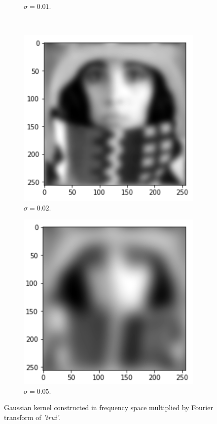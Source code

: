 \begin{figure}[H]
\begin{subfigure}[b]{0.45\textwidth}
		\caption{$\sigma = 0.01$.}
	\end{subfigure}
	\hfill
	\\
	\begin{subfigure}[b]{0.45\textwidth}
		\centering
		\includegraphics[width=\textwidth]{Materials/02}
		\caption{$\sigma = 0.02$.}
	\end{subfigure}
	\hfill
	\begin{subfigure}[b]{0.45\textwidth}
		\centering
		\includegraphics[width=\textwidth]{Materials/05}
		\caption{$\sigma = 0.05$.}
	\end{subfigure}
	\caption{Gaussian kernel constructed in frequency space multiplied by Fourier transform of \textit{'trui'}.}
	\label{gaussian}
\end{figure}

